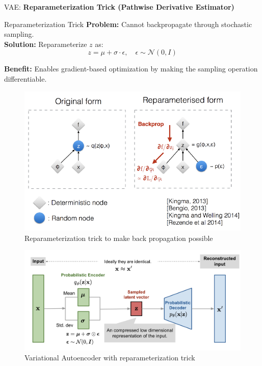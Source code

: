 \begin{frame}{}
	\LARGE VAE: \textbf{Reparameterization Trick (Pathwise Derivative Estimator)}
\end{frame}

\begin{frame}[allowframebreaks]{Reparameterization Trick}
\textbf{Problem:} Cannot backpropagate through stochastic sampling.\\[1em]

\textbf{Solution:} Reparameterize $z$ as:
\[
z = \mu + \sigma \cdot \epsilon, \quad \epsilon \sim \mathcal{N}(0, I)
\]

\textbf{Benefit:} Enables gradient-based optimization by making the sampling operation differentiable.

\framebreak

\begin{figure}
	\centering
	\includegraphics[height=0.8\textheight, width=\textwidth, keepaspectratio]{images/vae/reparam_trick.png}
	\caption*{Reparameterization trick to make back propagation possible}
\end{figure}

\framebreak

\begin{figure}
	\centering
	\includegraphics[height=0.8\textheight, width=\textwidth, keepaspectratio]{images/vae/reparam_trick_network.png}
	\caption*{Variational Autoencoder with reparameterization trick}
\end{figure}
\end{frame}

